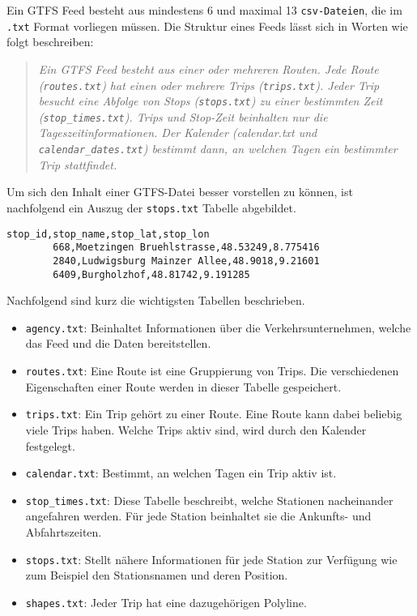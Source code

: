       Ein GTFS Feed besteht aus mindestens 6 und maximal 13 \texttt{csv-Dateien}, die im \texttt{.txt} Format vorliegen müssen. Die Struktur eines Feeds lässt sich in Worten wie folgt beschreiben:

      \begin{quote}
        \textit{Ein GTFS Feed besteht aus einer oder mehreren Routen. Jede Route (\texttt{routes.txt}) hat einen oder mehrere Trips (\texttt{trips.txt}). Jeder Trip besucht eine Abfolge von Stops (\texttt{stops.txt}) zu einer bestimmten Zeit (\texttt{stop\_times.txt}). Trips und Stop-Zeit beinhalten nur die Tageszeitinformationen. Der Kalender (calendar.txt und \texttt{calendar\_dates.txt}) bestimmt dann, an welchen Tagen ein bestimmter Trip stattfindet.} \cite[S. 8]{zervaas}
      \end{quote}

      Um sich den Inhalt einer GTFS-Datei besser vorstellen zu können, ist nachfolgend ein Auszug der \texttt{stops.txt} Tabelle abgebildet.

      \begin{lstlisting}[captionpos=b, caption=Auszug der ersten Zeilen von \texttt{stops.txt}, label=lst:gtfs-auszug]
        stop_id,stop_name,stop_lat,stop_lon
        668,Moetzingen Bruehlstrasse,48.53249,8.775416
        2840,Ludwigsburg Mainzer Allee,48.9018,9.21601
        6409,Burgholzhof,48.81742,9.191285
      \end{lstlisting}

      Nachfolgend sind kurz die wichtigsten Tabellen beschrieben.

      \begin{itemize}
        \item \texttt{agency.txt}: Beinhaltet Informationen über die Verkehrsunternehmen, welche das Feed und die Daten bereitstellen.

        \item \texttt{routes.txt}: Eine Route ist eine Gruppierung von Trips. Die verschiedenen Eigenschaften einer Route werden in dieser Tabelle gespeichert.

        \item \texttt{trips.txt}: Ein Trip gehört zu einer Route. Eine Route kann dabei beliebig viele Trips haben. Welche Trips aktiv sind, wird durch den Kalender festgelegt.

        \item \texttt{calendar.txt}: Bestimmt, an welchen Tagen ein Trip aktiv ist.

        \item \texttt{stop\_times.txt}: Diese Tabelle beschreibt, welche Stationen nacheinander angefahren werden. Für jede Station beinhaltet sie die Ankunfts- und Abfahrtszeiten.

        \item \texttt{stops.txt}: Stellt nähere Informationen für jede Station zur Verfügung wie zum Beispiel den Stationsnamen und deren Position.

        \item \texttt{shapes.txt}: Jeder Trip hat eine dazugehörigen Polyline.

      \end{itemize}

